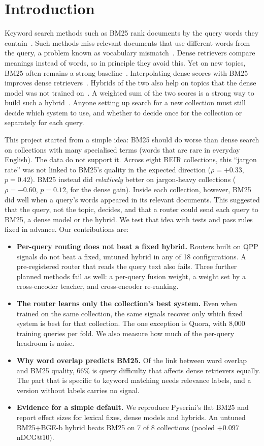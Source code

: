 \documentclass[conference]{IEEEtran}
\makeatletter
\newcommand{\ndcg}{nDCG@10}
\makeatother
\begin{document}
\section{Introduction}
Keyword search methods such as BM25 rank documents by the query words they contain~\cite{robertson2009prf}. Such methods miss relevant documents that use different words from the query, a problem known as vocabulary mismatch~\cite{furnas1987vocabulary}. Dense retrievers compare meanings instead of words, so in principle they avoid this. Yet on new topics, BM25 often remains a strong baseline~\cite{thakur2021beir}. Interpolating dense scores with BM25 improves dense retrievers~\cite{wang2021bert}. Hybrids of the two also help on topics that the dense model was not trained on~\cite{chen2022out}. A weighted sum of the two scores is a strong way to build such a hybrid~\cite{bruch2024fusion}. Anyone setting up search for a new collection must still decide which system to use, and whether to decide once for the collection or separately for each query.

This project started from a simple idea: BM25 should do worse than dense search on collections with many specialised terms (words that are rare in everyday English). The data do not support it. Across eight BEIR collections, this ``jargon rate'' was not linked to BM25's quality in the expected direction ($\rho=+0.33$, $p=0.42$). BM25 instead did \emph{relatively} better on jargon-heavy collections ($\rho=-0.60$, $p=0.12$, for the dense gain). Inside each collection, however, BM25 did well when a query's words appeared in its relevant documents. This suggested that the query, not the topic, decides, and that a router could send each query to BM25, a dense model or the hybrid. We test that idea with tests and pass rules fixed in advance. Our contributions are:
\begin{itemize}
\item \textbf{Per-query routing does not beat a fixed hybrid.} Routers built on QPP signals do not beat a fixed, untuned hybrid in any of 18 configurations. A pre-registered router that reads the query text also fails. Three further planned methods fail as well: a per-query fusion weight, a weight set by a cross-encoder teacher, and cross-encoder re-ranking.
\item \textbf{The router learns only the collection's best system.} Even when trained on the same collection, the same signals recover only which fixed system is best for that collection. The one exception is Quora, with 8,000 training queries per fold. We also measure how much of the per-query headroom is noise.
\item \textbf{Why word overlap predicts BM25.} Of the link between word overlap and BM25 quality, 66\% is query difficulty that affects dense retrievers equally. The part that is specific to keyword matching needs relevance labels, and a version without labels carries no signal.
\item \textbf{Evidence for a simple default.} We reproduce Pyserini's flat BM25 and report effect sizes for lexical fixes, dense models and hybrids. An untuned BM25+BGE-b hybrid beats BM25 on 7 of 8 collections (pooled $+0.097$ \ndcg{}).
\end{itemize}
\end{document}

